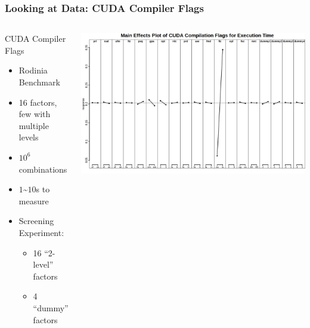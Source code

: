 \documentclass[10pt, compress, aspectratio=169, xcolor={table,usenames,dvipsnames}]{beamer}
\begin{document}
\begin{frame}
    \frametitle{Looking at Data: CUDA Compiler Flags}
    \begin{columns}[c]
            \begin{block}{CUDA Compiler Flags}
                \begin{itemize}
                    \item \alert{Rodinia Benchmark}
                    \item \alert{16} factors, \alert{few with
                        multiple levels}
                    \item \alert{$10^6$} combinations
                    \item \alert{$1$\textasciitilde$10$s} to measure
                    \item \alert{Screening Experiment}:
                        \begin{itemize}
                            \item \alert{16 ``2-level''} factors
                            \item \alert{4 ``dummy''} factors
                        \end{itemize}
                \end{itemize}
            \end{block}

            \begin{block}{}
                \vspace{-.4cm}
                \includegraphics[width=.98\textwidth]{main_effects_gpu}
            \end{block}

    \end{columns}
\end{frame}
\end{document}
